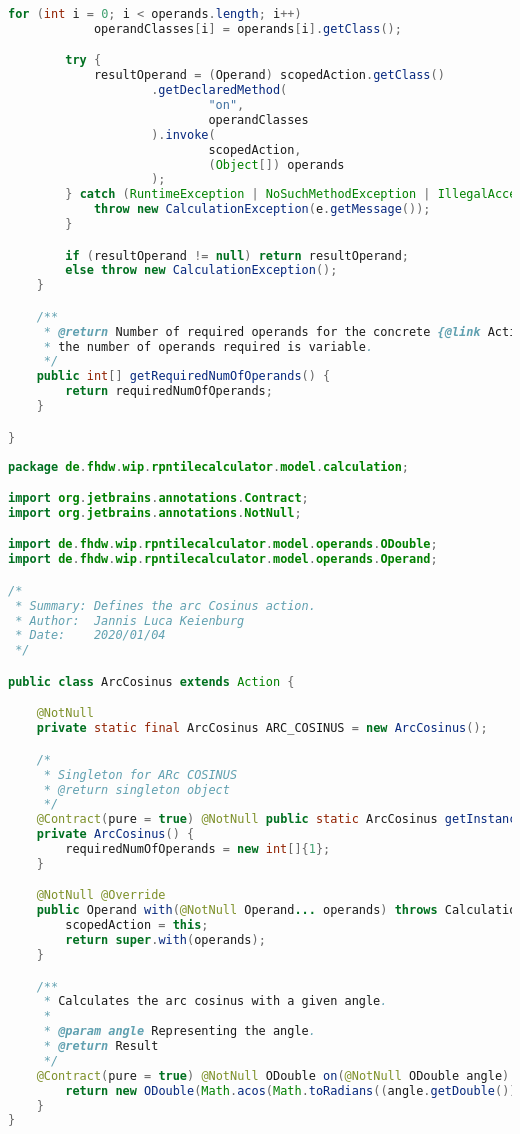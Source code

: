 \begin{lstlisting}[caption=Action (Schwenke),label=list:Action,language=Java]
        for (int i = 0; i < operands.length; i++)
            operandClasses[i] = operands[i].getClass();

        try {
            resultOperand = (Operand) scopedAction.getClass()
                    .getDeclaredMethod(
                            "on",
                            operandClasses
                    ).invoke(
                            scopedAction,
                            (Object[]) operands
                    );
        } catch (RuntimeException | NoSuchMethodException | IllegalAccessException | InvocationTargetException e) {
            throw new CalculationException(e.getMessage());
        }

        if (resultOperand != null) return resultOperand;
        else throw new CalculationException();
    }

    /**
     * @return Number of required operands for the concrete {@link Action}. If {@code -1}
     * the number of operands required is variable.
     */
    public int[] getRequiredNumOfOperands() {
        return requiredNumOfOperands;
    }

}
\end{lstlisting}    

\begin{lstlisting}[caption=ArcCosinus (Keienburg),label=list:ArcCosinus,language=Java]
package de.fhdw.wip.rpntilecalculator.model.calculation;

import org.jetbrains.annotations.Contract;
import org.jetbrains.annotations.NotNull;

import de.fhdw.wip.rpntilecalculator.model.operands.ODouble;
import de.fhdw.wip.rpntilecalculator.model.operands.Operand;

/*
 * Summary: Defines the arc Cosinus action.
 * Author:  Jannis Luca Keienburg
 * Date:    2020/01/04
 */

public class ArcCosinus extends Action {

    @NotNull
    private static final ArcCosinus ARC_COSINUS = new ArcCosinus();

    /*
     * Singleton for ARc COSINUS
     * @return singleton object
     */
    @Contract(pure = true) @NotNull public static ArcCosinus getInstance() { return ARC_COSINUS; }
    private ArcCosinus() {
        requiredNumOfOperands = new int[]{1};
    }

    @NotNull @Override
    public Operand with(@NotNull Operand... operands) throws CalculationException {
        scopedAction = this;
        return super.with(operands);
    }

    /**
     * Calculates the arc cosinus with a given angle.
     *
     * @param angle Representing the angle.
     * @return Result
     */
    @Contract(pure = true) @NotNull ODouble on(@NotNull ODouble angle) {
        return new ODouble(Math.acos(Math.toRadians((angle.getDouble()))));
    }
}
\end{lstlisting}    

